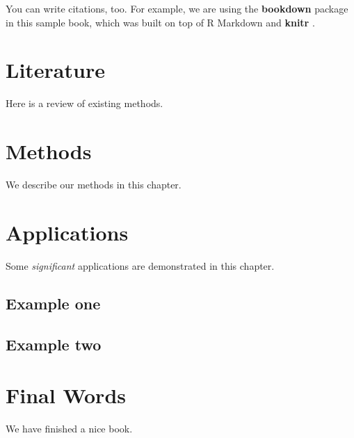 \documentclass[
]{book}
\begin{document}
You can write citations, too. For example, we are using the \textbf{bookdown} package \citep{R-bookdown} in this sample book, which was built on top of R Markdown and \textbf{knitr} \citep{xie2015}.

\hypertarget{literature}{%
\chapter{Literature}\label{literature}}

Here is a review of existing methods.

\hypertarget{methods}{%
\chapter{Methods}\label{methods}}

We describe our methods in this chapter.

\hypertarget{applications}{%
\chapter{Applications}\label{applications}}

Some \emph{significant} applications are demonstrated in this chapter.

\hypertarget{example-one}{%
\section{Example one}\label{example-one}}

\hypertarget{example-two}{%
\section{Example two}\label{example-two}}

\hypertarget{final-words}{%
\chapter{Final Words}\label{final-words}}

We have finished a nice book.

  
\end{document}
